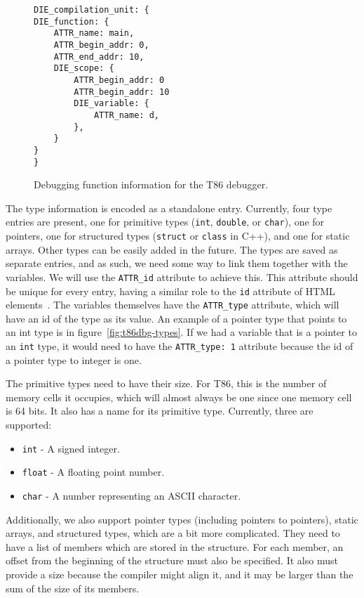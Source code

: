 \begin{figure}
    \begin{lstlisting}
DIE_compilation_unit: {
DIE_function: {
    ATTR_name: main,
    ATTR_begin_addr: 0,
    ATTR_end_addr: 10,
    DIE_scope: {
        ATTR_begin_addr: 0
        ATTR_begin_addr: 10
        DIE_variable: {
            ATTR_name: d,
        },
    }
}
}
    \end{lstlisting}
    \caption{Debugging function information for the T86 debugger.}
    \label{fig:t86dbg-die}
\end{figure}

The type information is encoded as a standalone entry. Currently, four type
entries are present, one for primitive types (\texttt{int}, \texttt{double}, or
\texttt{char}), one for pointers, one for structured types (\texttt{struct} or
\texttt{class} in C++), and one for static arrays. Other types can be easily
added in the future. The types are saved as separate entries, and as such, we
need some way to link them together with the variables. We will use the
\verb|ATTR_id| attribute to achieve this. This attribute should be unique for
every entry, having a similar role to the \texttt{id} attribute of HTML
elements~\cite{html4}. The variables themselves have the \verb|ATTR_type|
attribute, which will have an id of the type as its value. An example of a
pointer type that points to an int type is in figure~\ref{fig:t86dbg-types}. If
we had a variable that is a pointer to an \texttt{int} type, it would need to
have the \verb|ATTR_type: 1| attribute because the id of a pointer type to
integer is one.

The primitive types need to have their size. For T86, this is the number of
memory cells it occupies, which will almost always be one since one memory cell
is 64 bits. It also has a name for its primitive type. Currently, three are
supported:
\begin{itemize}
    \item \texttt{int} - A signed integer.
    \item \texttt{float} - A floating point number.
    \item \texttt{char} - A number representing an ASCII character.
\end{itemize}

Additionally, we also support pointer types (including pointers to pointers),
static arrays, and structured types, which are a bit more complicated. They
need to have a list of members which are stored in the structure. For each
member, an offset from the beginning of the structure must also be specified.
It also must provide a size because the compiler might align it, and it may be
larger than the sum of the size of its members.

